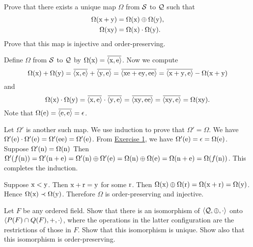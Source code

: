 \begin{exercise}
Prove that there exists a unique map $\Omega$ from $\mathcal{S}$ to $\mathcal{Q}$ such that
\begin{align*}
    \Omega(\mathrm{x} + \mathrm{y}) &= \Omega(\mathrm{x}) \oplus \Omega(\mathrm{y}),\\
    \Omega(\mathrm{xy}) &= \Omega(\mathrm{x})\cdot\Omega(\mathrm{y}).
\end{align*}
Prove that this map is injective and order-preserving.
\end{exercise}

\begin{solution}
Define $\Omega$ from $\mathcal{S}$ to $\mathcal{Q}$ by $\Omega(\mrm x)=\overbar{\aprn{\mrm x,\mrm e}}$. 
Now we compute
\[\Omega(\mrm x) + \Omega(\mrm y)=\overbar{\aprn{\mrm x,\mrm e}} + \overbar{\aprn{\mrm y,\mrm e}}
=\overbar{\aprn{\mrm{xe}+\mrm{ey},\mrm{ee}}}
=\overbar{\aprn{\mrm{x}+\mrm{y},\mrm{e}}}-\Omega(\mrm x + \mrm y)\]
and
\[\Omega(\mrm x) \cdot \Omega(\mrm y)=\overbar{\aprn{\mrm x,\mrm e}} \cdot \overbar{\aprn{\mrm y,\mrm e}}
=\overbar{\aprn{\mrm{xy},\mrm{ee}}}
=\overbar{\aprn{\mrm{xy},\mrm{e}}}=\Omega(\mrm{xy}).\]
Note that $\Omega(\mrm e)=\overbar{\aprn{\mrm e,\mrm e}}=\eps$.

Let $\Omega'$ is another such map. We use induction to prove that $\Omega'=\Omega$.
We have $\Omega'(\mathrm{e})\cdot \Omega'(\mathrm{e}) = \Omega'(\mathrm{e}\mathrm{e})
=\Omega'(\mathrm{e})$. From \hyperref[ex:9-2.1]{Exercise 1}, we have $\Omega'(\mathrm{e})=\epsilon=\Omega(\mathrm{e})$.
Suppose $\Omega'(\mathrm{n})=\Omega(\mathrm{n})$
Then $\Omega'(f(\mathrm{n})) = \Omega'(\mathrm{n} + \mathrm{e})=\Omega'(\mathrm{n}) \oplus \Omega'(\mathrm{e})
=\Omega(\mathrm{n}) \oplus \Omega(\mathrm{e})=\Omega(\mathrm{n} + \mathrm{e})=\Omega(f(\mathrm{n}))$.
This completes the induction.

Suppose $\mathrm{x} < \mathrm{y}$. Then $\mathrm{x} + \mathrm{r} = \mathrm{y}$ for some $\mathrm{r}$.
Then $\Omega(\mathrm{x})\oplus \Omega(\mathrm{r})=\Omega(\mathrm{x} + \mathrm{r}) = \Omega(\mathrm{y})$.
Hence $\Omega(\mathrm{x}) \prec \Omega(\mathrm{y})$.
Therefore $\Omega$ is order-preserving and injective.
\end{solution}

\begin{exercise}
Let $F$ be any ordered field.
Show that there is an isomorphism of $\left\langle\mathcal{Q},\oplus,\cdot\right\rangle$ onto
$\left\langle P(F)\cap Q(F),+,\cdot\right\rangle$, where the operations in the latter configuration are the
restrictions of those in $F$. Show that this isomorphism is unique.
Show also that this isomorphism is order-preserving.
\end{exercise}

